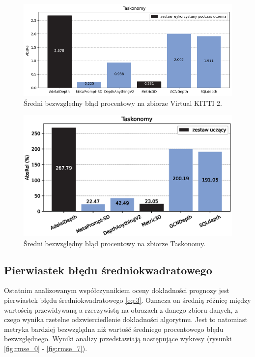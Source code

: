 \begin{figure}[H]
    \centering
    \includegraphics{plots/absrel/6}
    \caption{Średni bezwzględny błąd procentowy na zbiorze Virtual KITTI 2.}
    \label{fig:absrel_6}
\end{figure}
\begin{figure}[H]
    \centering
    \includegraphics{plots/absrel/7}
    \caption{Średni bezwzględny błąd procentowy na zbiorze Taskonomy.}
    \label{fig:absrel_7}
\end{figure}

\subsection{Pierwiastek błędu średniokwadratowego}
Ostatnim analizowanym współczynnikiem oceny dokładności prognozy jest pierwiastek błędu średniokwadratowego \ref{eq:3}. Oznacza on średnią różnicę między wartością przewidywaną a rzeczywistą na obrazach z danego zbioru danych, z czego wynika rzetelne odzwierciedlenie dokładności algorytmu. Jest to natomiast metryka bardziej bezwzględna niż wartość średniego procentowego błędu bezwzględnego. Wyniki analizy przedstawiają następujące wykresy (rysunki \ref{fig:rmse_0} - \ref{fig:rmse_7}).


